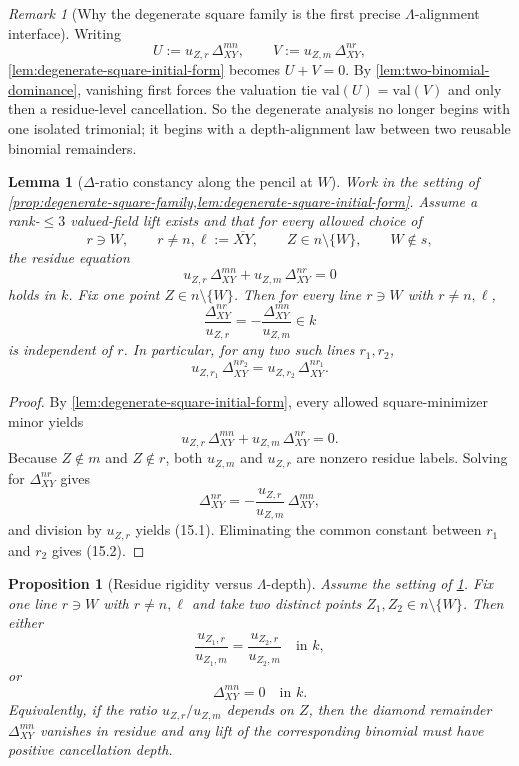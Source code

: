 \documentclass[11pt]{amsart}
\numberwithin{equation}{section}
\theoremstyle{plain}
\newtheorem{lemma}[theorem]{Lemma}
\newtheorem{proposition}[theorem]{Proposition}
\theoremstyle{definition}
\theoremstyle{remark}
\newtheorem{remark}[theorem]{Remark}
\newcommand{\val}{\mathrm{val}}
\newcommand{\Lam}{\Lambda}
\begin{document}
\begin{remark}[Why the degenerate square family is the first precise $\Lam$-alignment interface]
Writing
\[
U:=u_{Z,r}\,\Delta_{XY}^{mn},
\qquad
V:=u_{Z,m}\,\Delta_{XY}^{nr},
\]
\cref{lem:degenerate-square-initial-form} becomes $U+V=0$. By \cref{lem:two-binomial-dominance}, vanishing first forces the valuation tie
$\val(U)=\val(V)$ and only then a residue-level cancellation. So the degenerate analysis no longer begins with one isolated trimonial; it begins
with a depth-alignment law between two reusable binomial remainders.
\end{remark}

\begin{lemma}[$\Delta$-ratio constancy along the pencil at $W$]
\label{lem:delta-ratio-constancy}
Work in the setting of \cref{prop:degenerate-square-family,lem:degenerate-square-initial-form}. Assume a rank-$\le 3$ valued-field lift exists and that for every allowed choice of
\[
r\ni W,\qquad r\neq n,\ell:=\overline{XY},\qquad Z\in n\setminus\{W\},\qquad W\notin s,
\]
the residue equation
\[u_{Z,r}\,\Delta_{XY}^{mn}+u_{Z,m}\,\Delta_{XY}^{nr}=0
\tag{15.0}
\]
holds in $k$.
Fix one point $Z\in n\setminus\{W\}$. Then for every line $r\ni W$ with $r\neq n,\ell$,
\[
\frac{\Delta_{XY}^{nr}}{u_{Z,r}}
=
-\frac{\Delta_{XY}^{mn}}{u_{Z,m}}
\in k
\tag{15.1}
\]
is independent of $r$. In particular, for any two such lines $r_1,r_2$,
\[u_{Z,r_1}\,\Delta_{XY}^{nr_2}=u_{Z,r_2}\,\Delta_{XY}^{nr_1}.
\tag{15.2}
\]
\end{lemma}

\begin{proof}
By \cref{lem:degenerate-square-initial-form}, every allowed square-minimizer minor yields
\[u_{Z,r}\,\Delta_{XY}^{mn}+u_{Z,m}\,\Delta_{XY}^{nr}=0.
\]
Because $Z\notin m$ and $Z\notin r$, both $u_{Z,m}$ and $u_{Z,r}$ are nonzero residue labels. Solving for $\Delta_{XY}^{nr}$ gives
\[
\Delta_{XY}^{nr}=-\frac{u_{Z,r}}{u_{Z,m}}\,\Delta_{XY}^{mn},
\]
and division by $u_{Z,r}$ yields \textup{(15.1)}. Eliminating the common constant between $r_1$ and $r_2$ gives \textup{(15.2)}.
\end{proof}

\begin{proposition}[Residue rigidity versus $\Lam$-depth]
\label{prop:rigidity-vs-depth}
Assume the setting of \cref{lem:delta-ratio-constancy}. Fix one line $r\ni W$ with $r\neq n,\ell$ and take two distinct points
$Z_1,Z_2\in n\setminus\{W\}$. Then either
\[
\frac{u_{Z_1,r}}{u_{Z_1,m}}=\frac{u_{Z_2,r}}{u_{Z_2,m}}
\quad\text{in }k,
\tag{15.3}
\]
or
\[
\Delta_{XY}^{mn}=0
\quad\text{in }k.
\tag{15.4}
\]
Equivalently, if the ratio $u_{Z,r}/u_{Z,m}$ depends on $Z$, then the diamond remainder $\Delta_{XY}^{mn}$ vanishes in residue and any lift of the corresponding binomial must have positive cancellation depth.
\end{proposition}
\end{document}
